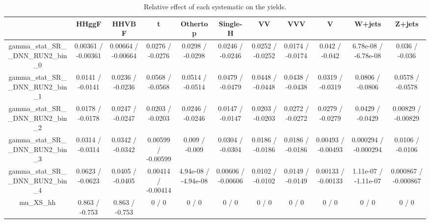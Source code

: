 \documentclass[10pt]{article}
\begin{document}
\begin{table}[htbp]
\begin{center}
\begin{tabular}{|c|c|c|c|c|c|c|c|c|c|c|}
\hline 
      & HHggF      & HHVBF      & t      & Othertop      & Single-H      & VV      & VVV      & V      & W+jets      & Z+jets \\ 
\hline 
  gamma_stat_SR__DNN_RUN2_bin_0 & 0.00361 / -0.00361 & 0.00664 / -0.00664 & 0.0276 / -0.0276 & 0.0298 / -0.0298 & 0.0246 / -0.0246 & 0.0252 / -0.0252 & 0.0174 / -0.0174 & 0.042 / -0.042 & 6.78e-08 / -6.78e-08 & 0.036 / -0.036 \\ 
  gamma_stat_SR__DNN_RUN2_bin_1 & 0.0141 / -0.0141 & 0.0236 / -0.0236 & 0.0568 / -0.0568 & 0.0514 / -0.0514 & 0.0479 / -0.0479 & 0.0448 / -0.0448 & 0.0438 / -0.0438 & 0.0319 / -0.0319 & 0.0806 / -0.0806 & 0.0578 / -0.0578 \\ 
  gamma_stat_SR__DNN_RUN2_bin_2 & 0.0178 / -0.0178 & 0.0247 / -0.0247 & 0.0203 / -0.0203 & 0.0246 / -0.0246 & 0.0147 / -0.0147 & 0.0203 / -0.0203 & 0.0272 / -0.0272 & 0.0279 / -0.0279 & 0.0429 / -0.0429 & 0.00829 / -0.00829 \\ 
  gamma_stat_SR__DNN_RUN2_bin_3 & 0.0314 / -0.0314 & 0.0342 / -0.0342 & 0.00599 / -0.00599 & 0.009 / -0.009 & 0.0304 / -0.0304 & 0.0186 / -0.0186 & 0.0186 / -0.0186 & 0.00493 / -0.00493 & 0.000294 / -0.000294 & 0.0106 / -0.0106 \\ 
  gamma_stat_SR__DNN_RUN2_bin_4 & 0.0623 / -0.0623 & 0.0405 / -0.0405 & 0.00414 / -0.00414 & 4.94e-08 / -4.94e-08 & 0.00606 / -0.00606 & 0.0102 / -0.0102 & 0.0149 / -0.0149 & 0.00133 / -0.00133 & 1.11e-07 / -1.11e-07 & 0.000867 / -0.000867 \\ 
  mu_XS_hh & 0.863 / -0.753 & 0.863 / -0.753 & 0 / 0 & 0 / 0 & 0 / 0 & 0 / 0 & 0 / 0 & 0 / 0 & 0 / 0 & 0 / 0 \\ 
\hline 
\end{tabular} 
\caption{Relative effect of each systematic on the yields.} 
\end{center} 
\end{table} 
\end{document}
